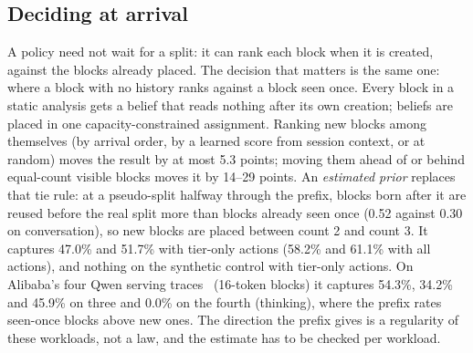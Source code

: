 \subsection{Deciding at arrival}
\label{sec:arrival}
A policy need not wait for a split: it can rank each block when it is created, against the blocks already
placed. The decision that matters is the same one: where a block with no history ranks against a block
seen once. Every block in a static analysis gets a belief that reads nothing after its own creation;
beliefs are placed in one capacity-constrained assignment. Ranking new blocks among themselves (by
arrival order, by a learned score from session context, or at random) moves the result by at most 5.3
points; moving them ahead of or behind equal-count visible blocks moves it by 14--29 points. An \emph{estimated
prior} replaces that tie rule: at a pseudo-split halfway through the prefix, blocks born after it are
reused before the real split more than blocks already seen once (0.52 against 0.30 on conversation), so
new blocks are placed between count 2 and count 3. It captures 47.0\% and 51.7\% with tier-only actions
(58.2\% and 61.1\% with all actions), and nothing on the synthetic control with tier-only actions. On Alibaba's four Qwen
serving traces~\cite{wang2025kvcachewild} (16-token blocks) it captures 54.3\%, 34.2\% and 45.9\% on three
and 0.0\% on the fourth (thinking), where the prefix rates seen-once blocks above new ones. The direction
the prefix gives is a regularity of these workloads, not a law, and the estimate has to be checked per
workload.
